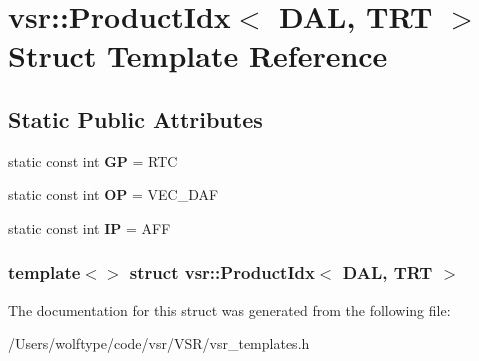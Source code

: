 \hypertarget{structvsr_1_1_product_idx_3_01_d_a_l_00_01_t_r_t_01_4}{\section{vsr\-:\-:Product\-Idx$<$ D\-A\-L, T\-R\-T $>$ Struct Template Reference}
\label{structvsr_1_1_product_idx_3_01_d_a_l_00_01_t_r_t_01_4}
}
\subsection*{Static Public Attributes}
\begin{DoxyCompactItemize}
\item 
\hypertarget{structvsr_1_1_product_idx_3_01_d_a_l_00_01_t_r_t_01_4_adc789489788374ee0bd5bf15b4b5edf4}{static const int {\bfseries G\-P} = R\-T\-C}\label{structvsr_1_1_product_idx_3_01_d_a_l_00_01_t_r_t_01_4_adc789489788374ee0bd5bf15b4b5edf4}

\item 
\hypertarget{structvsr_1_1_product_idx_3_01_d_a_l_00_01_t_r_t_01_4_abd4b97e28f913ee988546104ed223765}{static const int {\bfseries O\-P} = V\-E\-C\-\_\-\-D\-A\-F}\label{structvsr_1_1_product_idx_3_01_d_a_l_00_01_t_r_t_01_4_abd4b97e28f913ee988546104ed223765}

\item 
\hypertarget{structvsr_1_1_product_idx_3_01_d_a_l_00_01_t_r_t_01_4_ace7fd0964556a362155842257db4d238}{static const int {\bfseries I\-P} = A\-F\-F}\label{structvsr_1_1_product_idx_3_01_d_a_l_00_01_t_r_t_01_4_ace7fd0964556a362155842257db4d238}

\end{DoxyCompactItemize}
\subsubsection*{template$<$$>$ struct vsr\-::\-Product\-Idx$<$ D\-A\-L, T\-R\-T $>$}



The documentation for this struct was generated from the following file\-:\begin{DoxyCompactItemize}
\item 
/\-Users/wolftype/code/vsr/\-V\-S\-R/vsr\-\_\-templates.\-h\end{DoxyCompactItemize}
